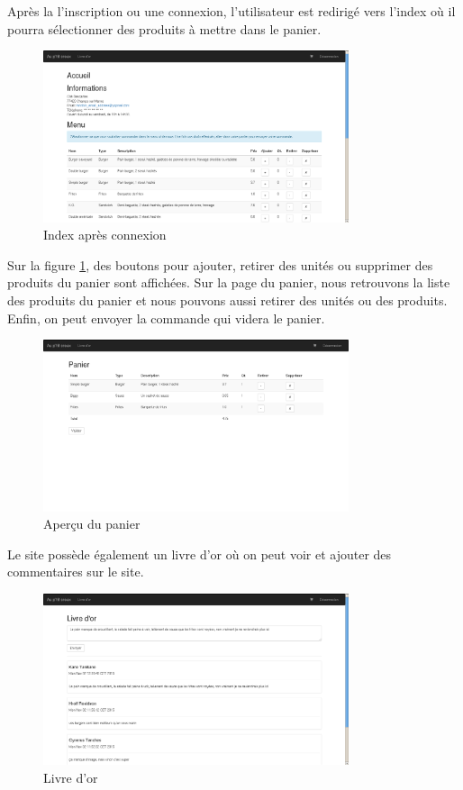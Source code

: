 Après la l'inscription ou une connexion, l'utilisateur est redirigé vers
l'index où il pourra sélectionner des produits à mettre dans le panier.

\begin{figure}[H]
	\centering
	\includegraphics[width=0.8\textwidth]{res/afterConnexion.png}
	\caption{Index après connexion}
	\label{fig:logged}
\end{figure}

Sur la figure \ref{fig:logged}, des boutons pour ajouter, retirer des unités ou
supprimer des produits du panier sont affichées. Sur la page du panier, nous
retrouvons la liste des produits du panier et nous pouvons aussi retirer des
unités ou des produits. Enfin, on peut envoyer la commande qui videra le panier.

\begin{figure}[H]
	\centering
	\includegraphics[width=0.8\textwidth]{res/panier.png}
	\caption{Aperçu du panier}
	\label{fig:cart}
\end{figure}

Le site possède également un livre d'or où on peut voir et ajouter des
commentaires sur le site.

\begin{figure}[H]
	\centering
	\includegraphics[width=0.8\textwidth]{res/livre_comment.png}
	\caption{Livre d'or}
	\label{fig:guestbook}
\end{figure}
